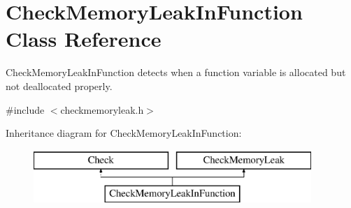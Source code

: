 \hypertarget{class_check_memory_leak_in_function}{\section{Check\-Memory\-Leak\-In\-Function Class Reference}
\label{class_check_memory_leak_in_function}
}


Check\-Memory\-Leak\-In\-Function detects when a function variable is allocated but not deallocated properly.  




{\ttfamily \#include $<$checkmemoryleak.\-h$>$}

Inheritance diagram for Check\-Memory\-Leak\-In\-Function\-:\begin{figure}[H]
\begin{center}
\leavevmode
\includegraphics[height=2.000000cm]{class_check_memory_leak_in_function}
\end{center}
\end{figure}
